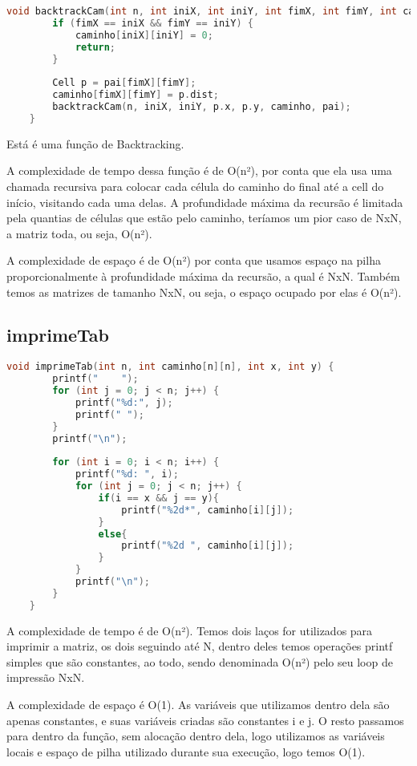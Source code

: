 \documentclass[relatorio]{IEEEtran}
\begin{document}
\begin{lstlisting}[language=C]
    void backtrackCam(int n, int iniX, int iniY, int fimX, int fimY, int caminho[n][n], Cell pai[n][n]) {
        if (fimX == iniX && fimY == iniY) {
            caminho[iniX][iniY] = 0;
            return;
        }
    
        Cell p = pai[fimX][fimY];
        caminho[fimX][fimY] = p.dist;
        backtrackCam(n, iniX, iniY, p.x, p.y, caminho, pai);
    }    
\end{lstlisting}

Está é uma função de Backtracking.

A complexidade de tempo dessa função é de O(n²), por conta que ela usa uma chamada recursiva para colocar cada célula do caminho do final até a cell do início, visitando cada uma delas. A profundidade máxima da recursão é limitada pela quantias de células que estão pelo caminho, teríamos um pior caso de NxN, a matriz toda, ou seja, O(n²).

A complexidade de espaço é de O(n²) por conta que usamos espaço na pilha proporcionalmente à profundidade máxima da recursão, a qual é NxN. Também temos as matrizes de tamanho NxN, ou seja, o espaço ocupado por elas é O(n²).

\subsection{imprimeTab}
\begin{lstlisting}[language=C]
    void imprimeTab(int n, int caminho[n][n], int x, int y) {
        printf("    ");
        for (int j = 0; j < n; j++) {
            printf("%d:", j);
            printf(" ");
        }
        printf("\n");
    
        for (int i = 0; i < n; i++) {
            printf("%d: ", i);
            for (int j = 0; j < n; j++) {
                if(i == x && j == y){
                    printf("%2d*", caminho[i][j]);
                }
                else{
                    printf("%2d ", caminho[i][j]);
                }
            }
            printf("\n");
        }
    }
\end{lstlisting}

A complexidade de tempo é de O(n²). Temos dois laços for utilizados para imprimir a matriz, os dois seguindo até N, dentro deles temos operações printf simples que são constantes, ao todo, sendo denominada O(n²) pelo seu loop de impressão NxN.

A complexidade de espaço é O(1). As variáveis que utilizamos dentro dela são apenas constantes, e suas variáveis criadas são constantes i e j. O resto passamos para dentro da função, sem alocação dentro dela, logo utilizamos as variáveis locais e espaço de pilha utilizado durante sua execução, logo temos O(1).
\end{document}
